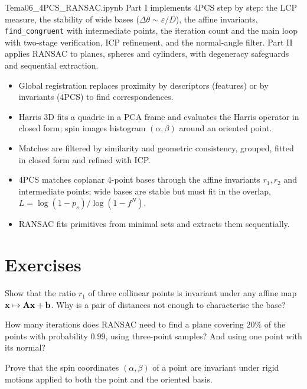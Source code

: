 
\begin{notebook}{Tema06\_4PCS\_RANSAC.ipynb}
Part I implements 4PCS step by step: the LCP measure, the stability of wide bases
($\Delta\theta\sim\varepsilon/D$), the affine invariants, \texttt{find\_congruent} with intermediate
points, the iteration count and the main loop with two-stage verification, ICP refinement, and the
normal-angle filter. Part II applies RANSAC to planes, spheres and cylinders, with degeneracy
safeguards and sequential extraction.
\end{notebook}

\begin{keypoints}
\begin{itemize}[leftmargin=*]
  \item Global registration replaces proximity by descriptors (features) or by invariants
  (4PCS) to find correspondences.
  \item Harris 3D fits a quadric in a PCA frame and evaluates the Harris operator in closed form;
  spin images histogram $(\alpha,\beta)$ around an oriented point.
  \item Matches are filtered by similarity and geometric consistency, grouped, fitted in closed form
  and refined with ICP.
  \item 4PCS matches coplanar 4-point bases through the affine invariants $r_1,r_2$ and
  intermediate points; wide bases are stable but must fit in the overlap,
  $L=\log(1-p_s)/\log(1-f^N)$.
  \item RANSAC fits primitives from minimal sets and extracts them sequentially.
\end{itemize}
\end{keypoints}

\section*{Exercises}
\begin{exercise}
Show that the ratio $r_1$ of three collinear points is invariant under any affine map
$\mathbf{x}\mapsto\mathbf{A}\mathbf{x}+\mathbf{b}$. Why is a pair of distances not enough to characterise the base?
\end{exercise}
\begin{exercise}
How many iterations does RANSAC need to find a plane covering $20\%$ of the points with
probability $0.99$, using three-point samples? And using one point with its normal?
\end{exercise}
\begin{exercise}
Prove that the spin coordinates $(\alpha,\beta)$ of a point are invariant under rigid motions
applied to both the point and the oriented basis.
\end{exercise}
